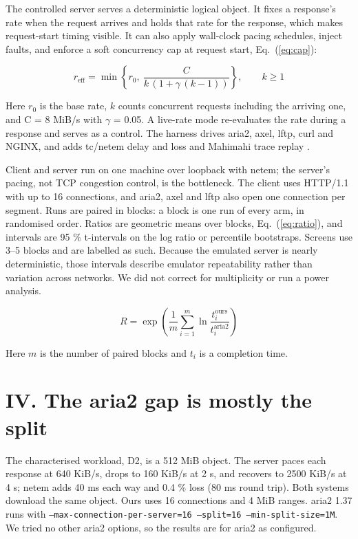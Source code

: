 \documentclass[conference]{IEEEtran}
\begin{document}
The controlled server serves a deterministic logical object. It fixes a response's rate when the request arrives and holds that rate for the response, which makes request-start timing visible. It can also apply wall-clock pacing schedules, inject faults, and enforce a soft concurrency cap at request start, Eq.~(\ref{eq:cap}):


\begin{equation}\label{eq:cap}r_{\mathrm{eff}} = \min\left\{r_0,\ \frac{C}{k\,(1+\gamma\,(k-1))}\right\}, \qquad k \ge 1\end{equation}

Here $r_0$ is the base rate, $k$ counts concurrent requests including the arriving one, and C = 8 MiB/s with $\gamma$ = 0.05. A live-rate mode re-evaluates the rate during a response and serves as a control. The harness drives aria2, axel, lftp, curl and NGINX, and adds tc/netem delay and loss \cite{tcnetem} and Mahimahi trace replay \cite{netravali2015mahimahi}.


Client and server run on one machine over loopback with netem; the server's pacing, not TCP congestion control, is the bottleneck. The client uses HTTP/1.1 with up to 16 connections, and aria2, axel and lftp also open one connection per segment. Runs are paired in blocks: a block is one run of every arm, in randomised order. Ratios are geometric means over blocks, Eq.~(\ref{eq:ratio}), and intervals are 95 \% t-intervals on the log ratio or percentile bootstraps. Screens use 3–5 blocks and are labelled as such. Because the emulated server is nearly deterministic, those intervals describe emulator repeatability rather than variation across networks. We did not correct for multiplicity or run a power analysis.


\begin{equation}\label{eq:ratio}R = \exp\left(\frac{1}{m}\sum_{i=1}^{m}\ln\frac{t_i^{\mathrm{ours}}}{t_i^{\mathrm{aria2}}}\right)\end{equation}

Here $m$ is the number of paired blocks and $t_i$ is a completion time.


\section*{IV. The aria2 gap is mostly the split}

The characterised workload, D2, is a 512 MiB object. The server paces each response at 640 KiB/s, drops to 160 KiB/s at 2 s, and recovers to 2500 KiB/s at 4 s; netem adds 40 ms each way and 0.4 \% loss (80 ms round trip). Both systems download the same object. Ours uses 16 connections and 4 MiB ranges. aria2 1.37 runs with \texttt{--max-connection-per-server=16 --split=16 --min-split-size=1M}. We tried no other aria2 options, so the results are for aria2 as configured.
\end{document}

